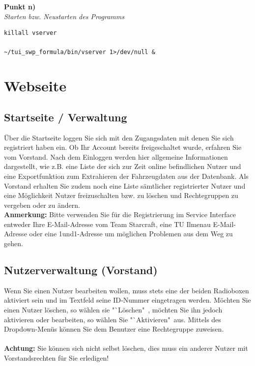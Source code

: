 \documentclass[fontsize = 12pt, paper = a4]{scrreprt}
\begin{document}
\textbf{Punkt n)} \\

\textit{Starten bzw. Neustarten des Programms}

\vspace*{4mm}
\begin{lstlisting}[frame=single]
killall vserver

~/tui_swp_formula/bin/vserver 1>/dev/null &
\end{lstlisting} 
\vspace*{-2mm}












\section{Webseite}

\subsection{Startseite / Verwaltung}

Über die Startseite loggen Sie sich mit den Zugangsdaten mit denen Sie sich registriert haben ein. 
Ob Ihr Account bereits freigeschaltet wurde, erfahren Sie vom Vorstand. 
Nach dem Einloggen werden hier allgemeine Informationen dargestellt, wie z.B. eine Liste der sich zur Zeit online befindlichen Nutzer und eine Exportfunktion zum Extrahieren der Fahrzeugdaten aus der Datenbank. 
Als Vorstand erhalten Sie zudem noch eine Liste sämtlicher registrierter Nutzer und eine Möglichkeit Nutzer freizuschalten bzw. zu löschen und Rechtegruppen zu vergeben oder zu ändern. \\

\textbf{Anmerkung:} Bitte verwenden Sie für die Registrierung im Service Interface entweder Ihre E-Mail-Adresse vom Team Starcraft, eine TU Ilmenau E-Mail-Adresse oder eine 1und1-Adresse um möglichen Problemen aus dem Weg zu gehen.

\subsection{Nutzerverwaltung (Vorstand)}

Wenn Sie einen Nutzer bearbeiten wollen, muss stets eine der beiden Radioboxen aktiviert sein und im Textfeld seine ID-Nummer eingetragen werden. Möchten Sie einen Nutzer löschen, so wählen sie "`Löschen"\ , möchten Sie ihn jedoch aktivieren oder bearbeiten, so wählen Sie "`Aktivieren"\ aus. Mittels des Dropdown-Menüs können Sie dem Benutzer eine Rechtegruppe zuweisen. \\ \\
\textbf{Achtung:} Sie können sich nicht selbst löschen, dies muss ein anderer Nutzer mit Vorstandsrechten für Sie erledigen!
\end{document}
